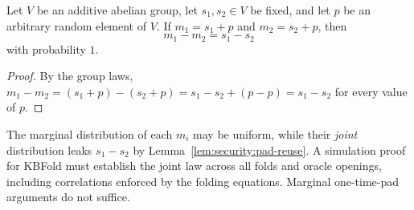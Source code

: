 \begin{lemma}\label{lem:security:pad-reuse}
Let $V$ be an additive abelian group, let $s_1,s_2\in V$ be fixed, and let $p$ be an arbitrary random element of $V$. If $m_1=s_1+p$ and $m_2=s_2+p$, then
\[
 m_1-m_2=s_1-s_2
\]
with probability $1$.
\end{lemma}
\begin{proof}
By the group laws,
$m_1-m_2=(s_1+p)-(s_2+p)=s_1-s_2+(p-p)=s_1-s_2$ for every value of $p$.
\end{proof}

\begin{remark}
The marginal distribution of each $m_i$ may be uniform, while their \emph{joint} distribution leaks $s_1-s_2$ by Lemma~\ref{lem:security:pad-reuse}. A simulation proof for KBFold must establish the joint law across all folds and oracle openings, including correlations enforced by the folding equations. Marginal one-time-pad arguments do not suffice.
\end{remark}
